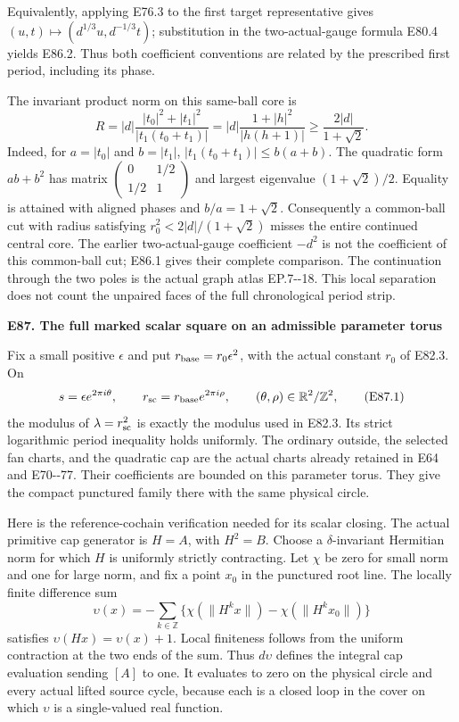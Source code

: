 Equivalently, applying E76.3 to the first target representative
gives \((u,t)\mapsto(d^{1/3}u,d^{-1/3}t)\); substitution in
the two-actual-gauge formula E80.4 yields E86.2. Thus both
coefficient conventions are related by the prescribed first
period, including its phase.

The invariant product norm on this same-ball core is
\[
 R=|d|\frac{|t_0|^2+|t_1|^2}{|t_1(t_0+t_1)|}
   =|d|\frac{1+|h|^2}{|h(h+1)|}
   \ge \frac{2|d|}{1+\sqrt2}.                 \tag{E86.3}
\]
Indeed, for \(a=|t_0|\) and \(b=|t_1|\),
\(|t_1(t_0+t_1)|\le b(a+b)\). The quadratic form
\(ab+b^2\) has matrix
\(\left(\begin{smallmatrix}0&1/2\\1/2&1\end{smallmatrix}\right)\)
and largest eigenvalue \((1+\sqrt2)/2\). Equality is
attained with aligned phases and \(b/a=1+\sqrt2\).
Consequently a common-ball cut with radius satisfying
\(r_0^2<2|d|/(1+\sqrt2)\) misses the entire continued
central core. The earlier two-actual-gauge coefficient
\(-d^2\) is not the coefficient of this common-ball cut;
E86.1 gives their complete comparison. The continuation
through the two poles is the actual graph atlas EP.7-\/-18.
This local separation does not count the unpaired faces
of the full chronological period strip.

\par

\medskip\noindent\textbf{E87. The full marked scalar square on an admissible parameter torus}

\par\nobreak

Fix a small positive \(\epsilon\) and put
\(r_{\rm base}=r_0\epsilon^2\), with the actual constant
\(r_0\) of E82.3. On
\[
 s=\epsilon e^{2\pi i\theta},\qquad
 r_{\rm sc}=r_{\rm base}e^{2\pi i\rho},
 \qquad (\theta,\rho)\in\mathbb R^2/\mathbb Z^2,
 \tag{E87.1}
\]
the modulus of \(\lambda=r_{\rm sc}^2\) is exactly the
modulus used in E82.3. Its strict logarithmic period
inequality holds uniformly. The ordinary outside, the
selected fan charts, and the quadratic cap are the actual
charts already retained in E64 and E70-\/-77. Their coefficients
are bounded on this parameter torus. They give the compact
punctured family there with the same physical circle.

Here is the reference-cochain verification needed for its
scalar closing. The actual primitive cap generator is
\(H=A\), with \(H^2=B\). Choose a \(\delta\)-invariant
Hermitian norm for which \(H\) is uniformly strictly
contracting. Let \(\chi\) be zero for small norm and one
for large norm, and fix a point \(x_0\) in the punctured
root line. The locally finite difference sum
\[
 \upsilon(x)=-\sum_{k\in\mathbb Z}
 \{\chi(\|H^kx\|)-\chi(\|H^kx_0\|)\}
 \tag{E87.2}
\]
satisfies \(\upsilon(Hx)=\upsilon(x)+1\). Local finiteness
follows from the uniform contraction at the two ends of
the sum. Thus \(d\upsilon\) defines the integral cap
evaluation sending \([A]\) to one. It evaluates to zero
on the physical circle and every actual lifted source
cycle, because each is a closed loop in the cover on
which \(\upsilon\) is a single-valued real function.

